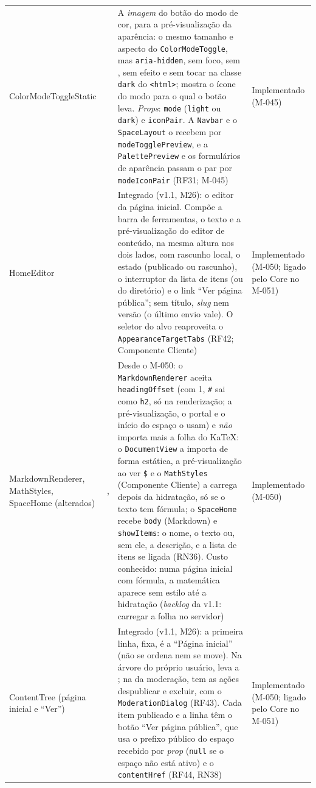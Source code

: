 \begin{longtable}{@{}L{3.3cm}L{2.9cm}L{6.0cm}L{2.2cm}@{}}
ColorModeToggleStatic &  & A \emph{imagem} do botão do modo de cor, para a pré-visualização da aparência: o mesmo tamanho e aspecto do \texttt{ColorModeToggle}, mas \texttt{aria-hidden}, sem foco, sem , sem efeito e sem tocar na classe \texttt{dark} do \texttt{<html>}; mostra o ícone do modo para o qual o botão leva. \emph{Props}: \texttt{mode} (\texttt{light} ou \texttt{dark}) e \texttt{iconPair}. A \texttt{Navbar} e o \texttt{SpaceLayout} o recebem por \texttt{modeTogglePreview}, e a \texttt{PalettePreview} e os formulários de aparência passam o par por \texttt{modeIconPair} (RF31; M-045) & Implementado (M-045)\\
HomeEditor &  & Integrado (v1.1, M26): o editor da página inicial. Compõe a barra de ferramentas, o texto e a pré-visualização do editor de conteúdo, na mesma altura nos dois lados, com rascunho local, o estado (publicado ou rascunho), o interruptor da lista de itens (ou do diretório) e o link ``Ver página pública''; sem título, \emph{slug} nem versão (o último envio vale). O seletor do alvo reaproveita o \texttt{AppearanceTargetTabs} (RF42; Componente Cliente) & Implementado (M-050; ligado pelo Core no M-051)\\
MarkdownRenderer, MathStyles, SpaceHome (alterados) & ,  & Desde o M-050: o \texttt{MarkdownRenderer} aceita \texttt{headingOffset} (com 1, \texttt{\#} sai como \texttt{h2}, só na renderização; a pré-visualização, o portal e o início do espaço o usam) e \emph{não} importa mais a folha do KaTeX: o \texttt{DocumentView} a importa de forma estática, a pré-visualização ao ver \texttt{\$} e o \texttt{MathStyles} (Componente Cliente) a carrega depois da hidratação, só se o texto tem fórmula; o \texttt{SpaceHome} recebe \texttt{body} (Markdown) e \texttt{showItems}: o nome, o texto ou, sem ele, a descrição, e a lista de itens se ligada (RN36). Custo conhecido: numa página inicial com fórmula, a matemática aparece sem estilo até a hidratação (\emph{backlog} da v1.1: carregar a folha no servidor) & Implementado (M-050)\\
ContentTree (página inicial e ``Ver'') &  & Integrado (v1.1, M26): a primeira linha, fixa, é a ``Página inicial'' (não se ordena nem se move). Na árvore do próprio usuário, leva a ; na da moderação, tem as ações despublicar e excluir, com o \texttt{ModerationDialog} (RF43). Cada item publicado e a linha têm o botão ``Ver página pública'', que usa o prefixo público do espaço recebido por \emph{prop} (\texttt{null} se o espaço não está ativo) e o \texttt{contentHref} (RF44, RN38) & Implementado (M-050; ligado pelo Core no M-051)\\

\end{longtable}
